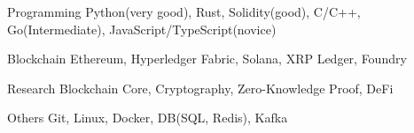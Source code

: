 


\begin{cvskills}


\cvskill
{Programming} %
{Python(very good), Rust, Solidity(good), C/C++, Go(Intermediate), JavaScript/TypeScript(novice)} %


\cvskill
{Blockchain} %
{Ethereum, Hyperledger Fabric, Solana, XRP Ledger, Foundry} %


\cvskill
{Research} %
{Blockchain Core, Cryptography, Zero-Knowledge Proof, DeFi} %


\cvskill
{Others} %
{Git, Linux, Docker, DB(SQL, Redis), Kafka} %


\end{cvskills}